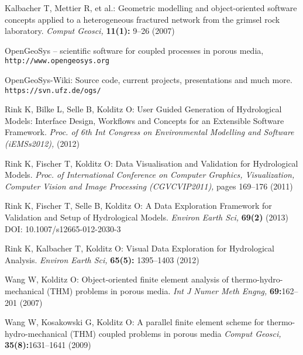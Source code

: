 {}

\begin{thebibliography}{}

Kalbacher T, Mettier R, et al.: Geometric modelling and object-oriented software concepts applied to a heterogeneous fractured network from the grimsel rock laboratory.
\emph{Comput Geosci,} \textbf{11(1):} 9--26 (2007)

OpenGeoSys -- scientific software for coupled processes in porous media,
\texttt{http://www.opengeosys.org}

OpenGeoSys-Wiki: Source code, current projects, presentations and much more. \texttt{https://svn.ufz.de/ogs/}

Rink K, Bilke L, Selle B, Kolditz O: User Guided Generation of Hydrological Models: Interface Design, Workflows and Concepts for an Extensible Software Framework. \emph{Proc. of 6th
Int Congress on Environmental Modelling and Software (iEMSs2012),} (2012)

Rink K, Fischer T, Kolditz O: Data Visualisation and Validation for Hydrological Models. \emph{Proc. of International Conference on Computer Graphics, Visualization, Computer Vision and Image Processing (CGVCVIP2011),} pages 169--176 (2011)

Rink K, Fischer T, Selle B, Kolditz O: A Data Exploration Framework for Validation and Setup of Hydrological Models.
\emph{Environ Earth Sci,} \textbf{69(2)} (2013) 
DOI: 10.1007/s12665-012-2030-3

Rink K, Kalbacher T, Kolditz O: Visual Data Exploration for Hydrological Analysis. \emph{Environ Earth Sci,} \textbf{65(5):} 1395--1403 (2012)

Wang W, Kolditz O: Object-oriented finite element analysis of thermo-hydro-mechanical (THM) problems in porous media.
\emph{Int J Numer Meth Engng,} \textbf{69:}162--201 (2007)

Wang W, Kosakowski G, Kolditz O: A parallel finite element scheme for thermo-hydro-mechanical (THM) coupled problems in porous media \emph{Comput Geosci,} \textbf{35(8):}1631--1641 (2009)

\end{thebibliography} 